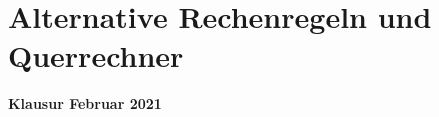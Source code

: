 



\section* {Alternative Rechenregeln und Querrechner}

\begin{center}

	{\bf {\large Klausur Februar 2021}}

\end{center}







